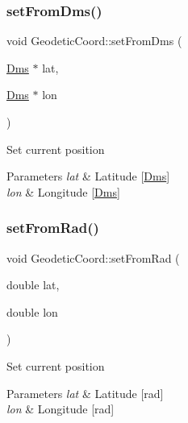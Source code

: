 \subsubsection{\texorpdfstring{set\+From\+Dms()}{setFromDms()}}
{\footnotesize\ttfamily void Geodetic\+Coord\+::set\+From\+Dms (\begin{DoxyParamCaption}\item[{\mbox{\hyperlink{struct_m210_1_1_dms}{Dms}} $\ast$}]{lat,  }\item[{\mbox{\hyperlink{struct_m210_1_1_dms}{Dms}} $\ast$}]{lon }\end{DoxyParamCaption})}

Set current position 
\begin{DoxyParams}{Parameters}
{\em lat} & Latitude \mbox{[}\mbox{\hyperlink{struct_m210_1_1_dms}{Dms}}\mbox{]} \\
\hline
{\em lon} & Longitude \mbox{[}\mbox{\hyperlink{struct_m210_1_1_dms}{Dms}}\mbox{]} \\
\hline
\end{DoxyParams}
\mbox{\label{class_m210_1_1_geodetic_coord_a5786ede63ff5e1ce58f56f76c1f183c1}} 
\subsubsection{\texorpdfstring{set\+From\+Rad()}{setFromRad()}}
{\footnotesize\ttfamily void Geodetic\+Coord\+::set\+From\+Rad (\begin{DoxyParamCaption}\item[{double}]{lat,  }\item[{double}]{lon }\end{DoxyParamCaption})}

Set current position 
\begin{DoxyParams}{Parameters}
{\em lat} & Latitude \mbox{[}rad\mbox{]} \\
\hline
{\em lon} & Longitude \mbox{[}rad\mbox{]} \\
\hline
\end{DoxyParams}
\mbox{\label{class_m210_1_1_geodetic_coord_ab3ec669f7868af7901701dc6a615147e}} 
